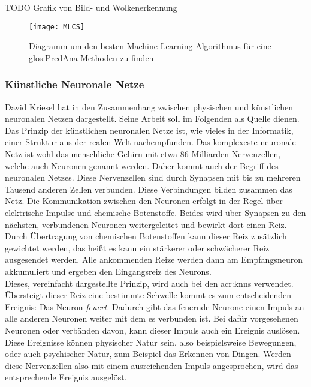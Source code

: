 TODO Grafik von Bild- und Wolkenerkennung\\

\begin{figure}%
	\centering
    \texttt{[image: MLCS]}
    \caption{Diagramm um den besten Machine Learning Algorithmus für eine \gls{glos:PredAna}-Methoden zu finden \cite{bib:AzureCs}}
    \label{fig:MLCS}
\end{figure}
  
\subsubsection{Künstliche Neuronale Netze}
\label{sec:KNN}
David Kriesel hat in \cite{bib:UebereblickNN} den Zusammenhang zwischen physischen und künstlichen neuronalen Netzen dargestellt. Seine Arbeit soll im Folgenden als Quelle dienen. Das Prinzip der künstlichen neuronalen Netze ist, wie vieles in der Informatik, einer Struktur aus der realen Welt nachempfunden. Das komplexeste neuronale Netz ist wohl das menschliche Gehirn mit etwa 86 Milliarden Nervenzellen, welche auch Neuronen genannt werden. Daher kommt auch der Begriff des neuronalen Netzes. Diese Nervenzellen sind durch Synapsen mit bis zu mehreren Tausend anderen Zellen verbunden. Diese Verbindungen bilden zusammen das Netz. Die Kommunikation zwischen den Neuronen erfolgt in der Regel über elektrische Impulse und chemische Botenstoffe. Beides wird über Synapsen zu den nächsten, verbundenen Neuronen weitergeleitet und bewirkt dort einen Reiz. Durch Übertragung von chemischen Botenstoffen kann dieser Reiz zusätzlich gewichtet werden, das heißt es kann ein stärkerer oder schwächerer Reiz ausgesendet werden. Alle ankommenden Reize werden dann am Empfangsneuron akkumuliert und ergeben den Eingangsreiz des Neurons.\\ 

Dieses, vereinfacht dargestellte Prinzip, wird auch bei den  \acrshort{acr:knn}s verwendet. Übersteigt dieser Reiz eine bestimmte Schwelle kommt es zum entscheidenden Ereignis: Das Neuron \textit{feuert}. Dadurch gibt das feuernde Neurone einen Impuls an alle anderen Neuronen weiter mit dem es verbunden ist. Bei dafür vorgesehenen Neuronen oder verbänden davon, kann dieser Impuls auch ein Ereignis auslösen. Diese Ereignisse können physischer Natur sein, also beispielsweise Bewegungen, oder auch psychischer Natur, zum Beispiel das Erkennen von Dingen. Werden diese Nervenzellen also mit einem ausreichenden Impuls angesprochen, wird das entsprechende Ereignis ausgelöst.\\

